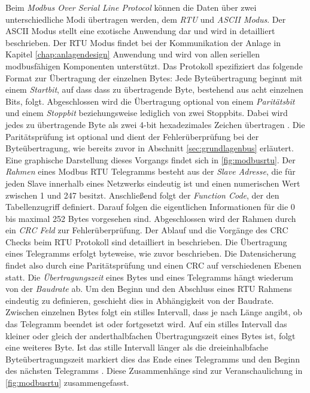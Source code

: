 Beim \textit{Modbus Over Serial Line Protocol} können die Daten über zwei unterschiedliche Modi übertragen werden, dem \textit{RTU} und \textit{ASCII Modus}. Der ASCII Modus stellt eine exotische Anwendung dar und wird in \cite{mod06ser} detailliert beschrieben.
Der RTU Modus findet bei der Kommunikation der Anlage in Kapitel \ref{chap:anlagendesign} Anwendung und wird von allen seriellen modbusfähigen Komponenten unterstützt.
Das Protokoll spezifiziert das folgende Format zur Übertragung der einzelnen Bytes: Jede Byteübertragung beginnt mit einem \textit{Startbit}, auf dass dass zu übertragende Byte, bestehend aus acht einzelnen Bits, folgt. Abgeschlossen wird die Übertragung optional von einem \textit{Paritätsbit} und einem \textit{Stoppbit} beziehungsweise lediglich von zwei Stoppbits. Dabei wird jedes zu übertragende Byte als zwei 4-bit hexadezimales Zeichen übertragen \cite[S.~12f.]{mod06ser}. Die Paritätsprüfung ist optional und dient der Fehlerüberprüfung bei der Byteübertragung, wie bereits zuvor in Abschnitt \ref{sec:grundlagenbus} erläutert. Eine graphische Darstellung dieses Vorgangs findet sich in \ref{fig:modbusrtu}.
Der \textit{Rahmen} eines Modbus RTU Telegramms besteht aus der \textit{Slave Adresse}, die für jeden Slave innerhalb eines Netzwerks eindeutig ist und einen numerischen Wert zwischen 1 und 247 besitzt. Anschließend folgt der \textit{Function Code}, der den Tabellenzugriff definiert. Darauf folgen die eigentlichen Informationen für die 0 bis maximal 252 Bytes vorgesehen sind. Abgeschlossen wird der Rahmen durch ein \textit{CRC Feld} zur Fehlerüberprüfung. Der Ablauf und die Vorgänge des CRC Checks beim RTU Protokoll sind detailliert in \cite{mod06ser} beschrieben. Die Übertragung eines Telegramms erfolgt byteweise, wie zuvor beschrieben. Die Datensicherung findet also durch eine Paritätsprüfung und einen CRC auf verschiedenen Ebenen statt.
Die \textit{Übertragungszeit} eines Bytes und eines Telegramms hängt wiederum von der \textit{Baudrate} ab. Um den Beginn und den Abschluss eines RTU Rahmens eindeutig zu definieren, geschieht dies in Abhängigkeit von der Baudrate. Zwischen einzelnen Bytes folgt ein stilles Intervall, dass je nach Länge angibt, ob das Telegramm beendet ist oder fortgesetzt wird. Auf ein stilles Intervall das kleiner oder gleich der anderthalbfachen Übertragungszeit eines Bytes ist, folgt eine weiteres Byte. Ist das stille Intervall länger als die dreieinhalbfache Byteübertragungszeit markiert dies das Ende eines Telegramms und den Beginn des nächsten Telegramms \cite[S.~13]{mod06ser}. Diese Zusammenhänge sind zur Veranschaulichung in \ref{fig:modbusrtu} zusammengefasst.


